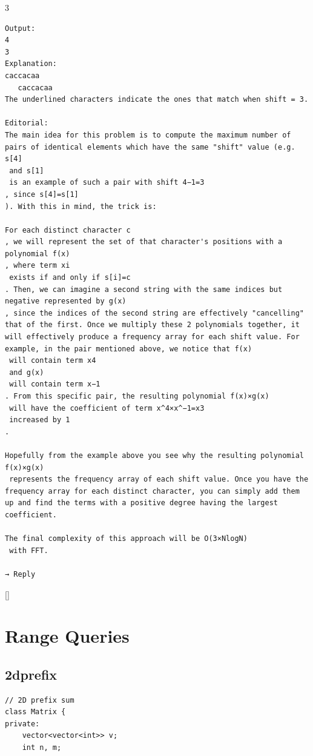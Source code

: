 \documentclass[twoside]{article}
\begin{document}
\begin{multicols*}{3}
\begin{verbatim}
Output:
4
3
Explanation:
caccacaa
   caccacaa
The underlined characters indicate the ones that match when shift = 3.

Editorial:
The main idea for this problem is to compute the maximum number of pairs of identical elements which have the same "shift" value (e.g. s[4]
 and s[1]
 is an example of such a pair with shift 4−1=3
, since s[4]=s[1]
). With this in mind, the trick is:

For each distinct character c
, we will represent the set of that character's positions with a polynomial f(x)
, where term xi
 exists if and only if s[i]=c
. Then, we can imagine a second string with the same indices but negative represented by g(x)
, since the indices of the second string are effectively "cancelling" that of the first. Once we multiply these 2 polynomials together, it will effectively produce a frequency array for each shift value. For example, in the pair mentioned above, we notice that f(x)
 will contain term x4
 and g(x)
 will contain term x−1
. From this specific pair, the resulting polynomial f(x)×g(x)
 will have the coefficient of term x^4×x^−1=x3
 increased by 1
.

Hopefully from the example above you see why the resulting polynomial f(x)×g(x)
 represents the frequency array of each shift value. Once you have the frequency array for each distinct character, you can simply add them up and find the terms with a positive degree having the largest coefficient.

The final complexity of this approach will be O(3×NlogN)
 with FFT.

→ Reply
\end{verbatim}

{
[\vspace{2em}]
\section*{Range Queries}
}
{
\subsection*{2dprefix}
}
\begin{verbatim}
// 2D prefix sum
class Matrix {
private:
    vector<vector<int>> v;
    int n, m;


\end{verbatim}
\end{multicols*}
\end{document}
